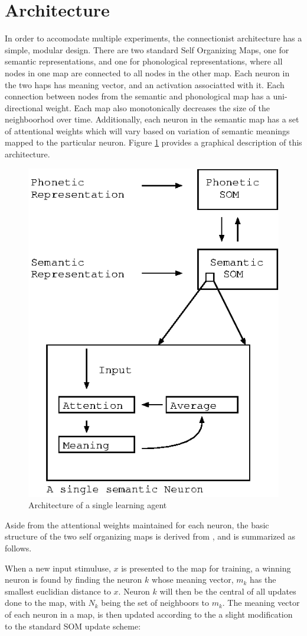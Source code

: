 \documentclass[a4paper,11pt]{article}
\begin{document}
\section{Architecture}

In order to accomodate multiple experiments, the connectionist architecture has
a simple, modular design.  There are two standard Self Organizing Maps, one for
semantic representations, and one for phonological representations, where all
nodes in one map are connected to all nodes in the other map.  Each neuron in
the two haps has meaning vector, and an activation associatted with it.  Each
connection between nodes from the semantic and phonological map has a
uni-directional weight.  Each map also monotonically decreases the size of the
neighboorhod over time.  Additionally, each neuron in the semantic map has a set
of attentional weights which will vary based on variation of semantic meanings
mapped to the particular neuron.  Figure \ref{fig:arch} provides a graphical
description of this architecture.

\begin{figure} \center \includegraphics[width=.49\textwidth]{arch.eps}
\caption{Architecture of a single learning agent} \label{fig:arch} \end{figure}

Aside from the attentional weights maintained for each neuron, the basic
structure of the two self organizing maps is derived from
\cite{LiDevLex,MiikDisLex}, and is summarized as follows.

When a new input stimuluse, $x$ is presented to the map for training, a winning
neuron is found by finding the neuron $k$ whose meaning vector, $m_k$ has the
smallest euclidian distance to $x$.  Neuron $k$ will then be the central of all
updates done to the map, with $N_k$ being the set of neighboors to $m_k$.  The
meaning vector of each neuron in a map, is then updated according to the a
slight modification to the standard SOM update scheme:
\end{document}

